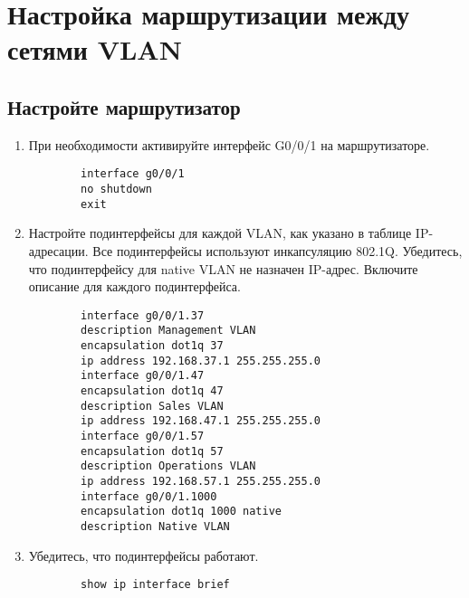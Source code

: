 \section{Настройка маршрутизации между сетями VLAN}
\subsection{Настройте маршрутизатор}
\begin{enumerate}[a]
    \item При необходимости активируйте интерфейс G0/0/1 на маршрутизаторе.
    \begin{verbatim}
        interface g0/0/1
        no shutdown
        exit
    \end{verbatim}

    \item Настройте подинтерфейсы для каждой VLAN, как указано в таблице IP-адресации.
    Все подинтерфейсы используют инкапсуляцию 802.1Q\@.
    Убедитесь, что подинтерфейсу для native VLAN не назначен IP-адрес.
    Включите описание для каждого подинтерфейса.

    \begin{verbatim}
        interface g0/0/1.37
        description Management VLAN
        encapsulation dot1q 37
        ip address 192.168.37.1 255.255.255.0
        interface g0/0/1.47
        encapsulation dot1q 47
        description Sales VLAN
        ip address 192.168.47.1 255.255.255.0
        interface g0/0/1.57
        encapsulation dot1q 57
        description Operations VLAN
        ip address 192.168.57.1 255.255.255.0
        interface g0/0/1.1000
        encapsulation dot1q 1000 native
        description Native VLAN
    \end{verbatim}

    \item Убедитесь, что подинтерфейсы работают.
    \begin{verbatim}
        show ip interface brief
    \end{verbatim}
\end{enumerate}

